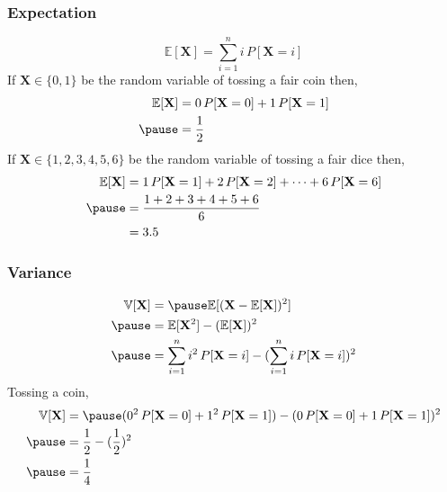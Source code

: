 \documentclass[12pt,aspectratio=169]{beamer}
\begin{document}
\begin{frame}
\frametitle{Expectation}
\[
\mathbb{E}[\mathbf{X}]=\sum_{i=1}^ni\,P[\mathbf{X}=i]
\]\pause
If $\mathbf{X}\in\{0,1\}$ be the random variable of tossing a fair coin then,\pause
\[
\begin{aligned}
\mathbb{E}[\mathbf{X}]&=0\,P[\mathbf{X}=0]+1\,P[\mathbf{X}=1]\\ \pause
&=\frac{1}{2}
\end{aligned}
\] \pause
If $\mathbf{X}\in\{1,2,3,4,5,6\}$ be the random variable of tossing a fair dice then,\pause
\[
\begin{aligned}
\mathbb{E}[\mathbf{X}]&=1\,P[\mathbf{X}=1]+2\,P[\mathbf{X}=2]+\dots+6\,P[\mathbf{X}=6]\\ \pause
&=\frac{1+2+3+4+5+6}{6}\\
&=3.5
\end{aligned}
\]

\end{frame}

\begin{frame}
\frametitle{Variance}
\[
\begin{aligned}
\mathbb{V}[\mathbf{X}]&=\pause \mathbb{E}[(\mathbf{X}-\mathbb{E}[\mathbf{X}])^2]\\ \pause
&=\mathbb{E}[\mathbf{X}^2]-(\mathbb{E}[\mathbf{X}])^2\\ \pause
&=\sum_{i=1}^ni^2\,P[\mathbf{X}=i]-(\sum_{i=1}^ni\,P[\mathbf{X}=i])^2
\end{aligned}
\] \pause
Tossing a coin, \pause
\[
\begin{aligned}
\mathbb{V}[\mathbf{X}]&=\pause (0^2\,P[\mathbf{X}=0]+1^2\,P[\mathbf{X}=1])-(0\,P[\mathbf{X}=0]+1\,P[\mathbf{X}=1])^2\\ \pause
&=\frac{1}{2}-(\frac{1}{2})^2\\ \pause
&= \frac{1}{4}
\end{aligned}
\]

\end{frame}
\end{document}
